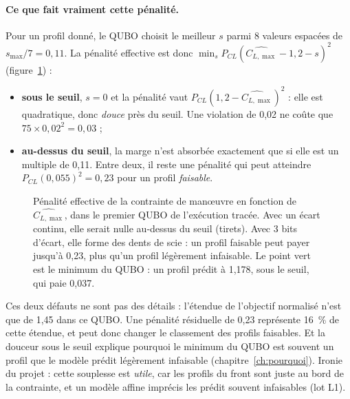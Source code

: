\paragraph{Ce que fait vraiment cette pénalité.} Pour un profil donné, le QUBO choisit le meilleur $s$ parmi 8 valeurs espacées de $s_{\max}/7=0{,}11$. La pénalité effective est donc $\min_s P_{CL}(\widehat{C_{L,\max}}-1{,}2-s)^2$ (figure~\ref{fig:penalite-cl}) :
\begin{itemize}
\item \textbf{sous le seuil}, $s=0$ et la pénalité vaut $P_{CL}(1{,}2-\widehat{C_{L,\max}})^2$ : elle est quadratique, donc \emph{douce} près du seuil. Une violation de 0,02 ne coûte que $75\times0{,}02^2=0{,}03$ ;
\item \textbf{au-dessus du seuil}, la marge n'est absorbée exactement que si elle est un multiple de 0,11. Entre deux, il reste une pénalité qui peut atteindre $P_{CL}(0{,}055)^2=0{,}23$ pour un profil \emph{faisable}.
\end{itemize}
\begin{figure}[htbp]
\centering

\caption{Pénalité effective de la contrainte de manœuvre en fonction de $\widehat{C_{L,\max}}$, dans le premier QUBO de l'exécution tracée. Avec un écart continu, elle serait nulle au-dessus du seuil (tirets). Avec 3 bits d'écart, elle forme des dents de scie : un profil faisable peut payer jusqu'à 0,23, plus qu'un profil légèrement infaisable. Le point vert est le minimum du QUBO : un profil prédit à 1,178, sous le seuil, qui paie 0,037.}\label{fig:penalite-cl}
\end{figure}
Ces deux défauts ne sont pas des détails : l'étendue de l'objectif normalisé n'est que de 1,45 dans ce QUBO. Une pénalité résiduelle de 0,23 représente 16~\% de cette étendue, et peut donc changer le classement des profils faisables. Et la douceur sous le seuil explique pourquoi le minimum du QUBO est souvent un profil que le modèle prédit légèrement infaisable (chapitre~\ref{ch:pourquoi}). Ironie du projet : cette souplesse est \emph{utile}, car les profils du front sont juste au bord de la contrainte, et un modèle affine imprécis les prédit souvent infaisables (lot L1).

